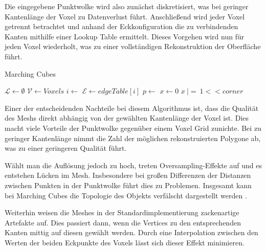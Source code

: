 Die eingegebene Punktwolke wird also zunächst diskretisiert, was bei geringer Kantenlänge der Voxel zu Datenverlust führt.
Anschließend wird jeder Voxel getrennt betrachtet und anhand der Eckkonfiguration die zu verbindenden Kanten mithilfe einer Lookup Table ermittelt.
Dieses Vorgehen wird nun für jeden Voxel wiederholt, was zu einer vollständigen Rekonstruktion der Oberfläche führt.

\begin{algorithm}[H]
\caption[Marching Cubes]{Marching Cubes \cite[Abs. 4]{lorensen1987marching}}
\label{alg:marching-cubes}
\begin{algorithmic}
\State $\mathcal{L} \gets \emptyset$
\State $\mathcal{V} \gets Voxels$
	\State $i \gets$ 
	\State $\mathcal{E} \gets edgeTable[i]$
		\State $p \gets$ 
		\State {}
	\EndFor
\EndFor
\State {}
	\State $x \gets 0$
			\State $x\ |=\ 1 << corner$
		\EndIf
	\EndFor
	\State {}
\EndFunction
\end{algorithmic}
\end{algorithm}

Einer der entscheidenden Nachteile bei diesem Algorithmus ist, dass die Qualität des Meshs direkt abhängig von der gewählten Kantenlänge der Voxel ist.
Dies macht viele Vorteile der Punktwolke gegenüber einem Voxel Grid zunichte.
Bei zu geringer Kantenlänge nimmt die Zahl der möglichen rekonstruierten Polygone ab, was zu einer geringeren Qualität führt.

Wählt man die Auflösung jedoch zu hoch, treten Oversampling-Effekte auf und es entstehen Lücken im Mesh.
Insbesondere bei großen Differenzen der Distanzen zwischen Punkten in der Punktwolke führt dies zu Problemen.
Insgesamt kann bei Marching Cubes die Topologie des Objekts verfälscht dargestellt werden \cite[2]{chernyaev1995marching}.

Weiterhin weisen die Meshes in der Standardimplementierung zackenartige Artefakte auf.
Dies passiert dann, wenn die Vertices zu den entsprechenden Kanten mittig auf diesen gewählt werden.
Durch eine Interpolation zwischen den Werten der beiden Eckpunkte des Voxels lässt sich dieser Effekt minimieren.


